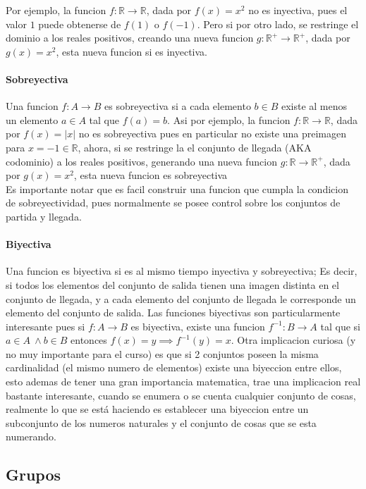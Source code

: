 Por ejemplo, la funcion $f : \mathbb{R} \to \mathbb{R}$, dada por $f(x) = x^2$ no es
inyectiva, pues el valor $1$ puede obtenerse de $f(1)$ o $f(-1)$. Pero si por otro
lado, se restringe el dominio a los reales positivos, creando una nueva funcion
$g: \mathbb{R}^+ \to \mathbb{R}^+$, dada por $g(x) = x^2$, esta nueva funcion si es
inyectiva.

\paragraph{Sobreyectiva}
Una funcion $f : A \to B$ es sobreyectiva si a cada elemento $b \in B$ existe al menos
un elemento $a \in A$ tal que $f(a) = b$. Asi por ejemplo, la funcion
$f : \mathbb{R} \to \mathbb{R}$, dada por $f(x) = |x|$ no es sobreyectiva pues en
particular no existe una preimagen para $x = -1 \in \mathbb{R}$, ahora, si se restringe
la el conjunto de llegada (AKA codominio) a los reales positivos, generando una nueva
funcion $g : \mathbb{R} \to \mathbb{R}^+$, dada por $g(x) = x^2$, esta nueva funcion es
sobreyectiva\\
Es importante notar que es facil construir una funcion que cumpla la condicion de
sobreyectividad, pues normalmente se posee control sobre los conjuntos de partida y
llegada.

\paragraph{Biyectiva}
Una funcion es biyectiva si es al mismo tiempo inyectiva y sobreyectiva; Es decir,
si todos los elementos del conjunto de salida tienen una imagen distinta en el
conjunto de llegada, y a cada elemento del conjunto de llegada le corresponde
un elemento del conjunto de salida.
Las funciones biyectivas son particularmente interesante pues si $f : A \to B$ es
biyectiva, existe una funcion $f^{-1} : B \to A$ tal que si $a \in A\ \land b \in B$
entonces $f(x) = y \implies f^{-1}(y) = x$.
Otra implicacion curiosa (y no muy importante para el curso) es que si 2 conjuntos
poseen la misma cardinalidad (el mismo numero de elementos) existe una biyeccion
entre ellos, esto ademas de tener una gran importancia matematica, trae una implicacion
real bastante interesante, cuando se enumera o se cuenta cualquier conjunto de cosas,
realmente lo que se está haciendo es establecer una biyeccion entre un subconjunto de
los numeros naturales y el conjunto de cosas que se esta numerando.

\subsection{Grupos}
